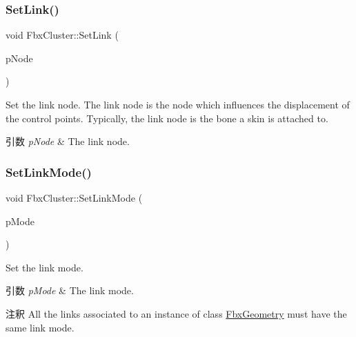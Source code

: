 \subsubsection{\texorpdfstring{Set\+Link()}{SetLink()}}
{\footnotesize\ttfamily void Fbx\+Cluster\+::\+Set\+Link (\begin{DoxyParamCaption}\item[{const \hyperlink{class_fbx_node}{Fbx\+Node} $\ast$}]{p\+Node }\end{DoxyParamCaption})}

Set the link node. The link node is the node which influences the displacement of the control points. Typically, the link node is the bone a skin is attached to. 
\begin{DoxyParams}{引数}
{\em p\+Node} & The link node. \\
\hline
\end{DoxyParams}
\mbox{\label{class_fbx_cluster_a13e98718c3604a08b7ac4c29ce763b2f}} 
\subsubsection{\texorpdfstring{Set\+Link\+Mode()}{SetLinkMode()}}
{\footnotesize\ttfamily void Fbx\+Cluster\+::\+Set\+Link\+Mode (\begin{DoxyParamCaption}\item[{\hyperlink{class_fbx_cluster_aaa2afaedfd33eda65c46bb5a3d04dab0}{E\+Link\+Mode}}]{p\+Mode }\end{DoxyParamCaption})}

Set the link mode. 
\begin{DoxyParams}{引数}
{\em p\+Mode} & The link mode. \\
\hline
\end{DoxyParams}
\begin{DoxyRemark}{注釈}
All the links associated to an instance of class \hyperlink{class_fbx_geometry}{Fbx\+Geometry} must have the same link mode. 
\end{DoxyRemark}
\mbox{\label{class_fbx_cluster_a8fd73a9d50d6bf35146c524cb49871aa}} 
